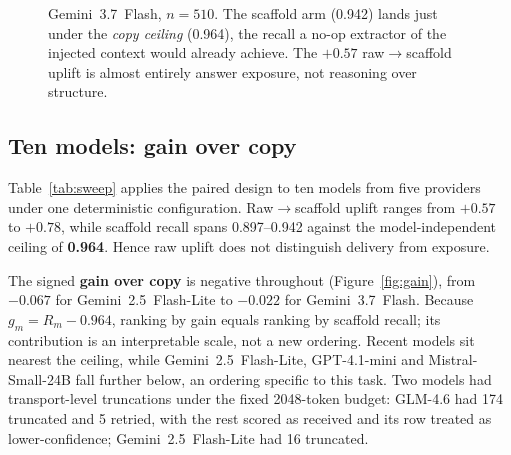 \documentclass[10pt,twocolumn]{article}
\begin{document}
\begin{figure}[t]\centering
{}
\caption{Gemini~3.7~Flash, $n=510$. The scaffold arm (0.942) lands just under the \emph{copy ceiling}
(0.964), the recall a no-op extractor of the injected context would already achieve. The $+0.57$
raw$\to$scaffold uplift is almost entirely answer exposure, not reasoning over structure.}
\label{fig:anchor}
\end{figure}

\subsection{Ten models: gain over copy}\label{sec:tenmodel}
Table~\ref{tab:sweep} applies the paired design to ten models from five providers under one deterministic configuration. Raw$\to$scaffold uplift ranges from $+0.57$ to $+0.78$, while scaffold recall spans 0.897--0.942 against the model-independent ceiling of \textbf{0.964}. Hence raw uplift does not distinguish delivery from exposure.

The signed \textbf{gain over copy} is negative throughout (Figure~\ref{fig:gain}), from $-0.067$ for Gemini~2.5~Flash-Lite to $-0.022$ for Gemini~3.7~Flash. Because $g_m=R_m-0.964$, ranking by gain equals ranking by scaffold recall; its contribution is an interpretable scale, not a new ordering. Recent models sit nearest the ceiling, while Gemini~2.5~Flash-Lite, GPT-4.1-mini and Mistral-Small-24B fall further below, an ordering specific to this task. Two models had transport-level truncations under the fixed 2048-token budget: GLM-4.6 had 174 truncated and 5 retried, with the rest scored as received and its row treated as lower-confidence; Gemini~2.5~Flash-Lite had 16 truncated.
\end{document}

